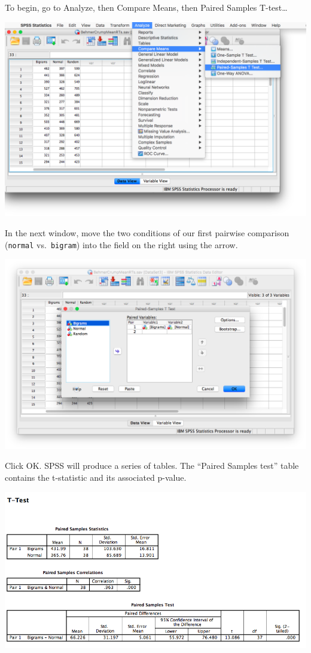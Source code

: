 \documentclass[
]{book}
\begin{document}
To begin, go to {Analyze}, then {Compare Means}, then {Paired Samples T-test\ldots{}}

\includegraphics{img/9.4.31.png}

In the next window, move the two conditions of our first pairwise comparison (\texttt{normal} vs.~\texttt{bigram}) into the field on the right using the arrow.

\includegraphics{img/9.4.32.png}

Click {OK}. SPSS will produce a series of tables. The ``Paired Samples test'' table contains the t-statistic and its associated p-value.

\includegraphics{img/9.4.33.png}
\end{document}
